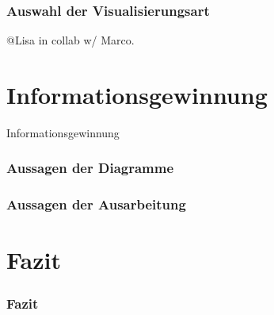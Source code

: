 \documentclass{beamer}
\begin{document}
\begin{frame}
	\frametitle{Auswahl der Visualisierungsart}
	@Lisa in collab w/ Marco.
\end{frame}

\section{Informationsgewinnung}
\begin{frame}
	\begin{center}
		{\Huge Informationsgewinnung}
	\end{center}
\end{frame}

\begin{frame}
	\frametitle{Aussagen der Diagramme}
\end{frame}

\begin{frame}
	\frametitle{Aussagen der Ausarbeitung}
\end{frame}

\section{Fazit}
\begin{frame}
	\frametitle{Fazit}
\end{frame}

\end{document}
